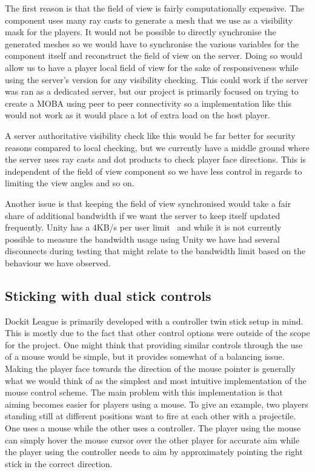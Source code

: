 The first reason is that the field of view is fairly computationally expensive. The component uses many ray casts to generate a mesh that we use as a visibility mask for the players. It would not be possible to directly synchronise the generated meshes so we would have to synchronise the various variables for the component itself and reconstruct the field of view on the server. Doing so would allow us to have a player local field of view for the sake of responsiveness while using the server's version for any visibility checking. This could work if the server was ran as a dedicated server, but our project is primarily focused on trying to create a MOBA using peer to peer connectivity so a implementation like this would not work as it would place a lot of extra load on the host player. 

A server authoritative visibility check like this would be far better for security reasons compared to local checking, but we currently have a middle ground where the server uses ray casts and dot products to check player face directions. This is independent of the field of view component so we have less control in regards to limiting the view angles and so on.

Another issue is that keeping the field of view synchronised would take a fair share of additional bandwidth if we want the server to keep itself updated frequently. Unity has a 4KB/s per user limit~\cite{unityNetworkBandwidthLimit} and while it is not currently possible to measure the bandwidth usage using Unity we have had several disconnects during testing that might relate to the bandwidth limit based on the behaviour we have observed.


\subsection{Sticking with dual stick controls}
Dockit League is primarily developed with a controller twin stick setup in mind. This is mostly due to the fact that other control options were outside of the scope for the project. One might think that providing similar controls through the use of a mouse would be simple, but it provides somewhat of a balancing issue. 
Making the player face towards the direction of the mouse pointer is generally what we would think of as the simplest and most intuitive implementation of the mouse control scheme. The main problem with this implementation is that aiming becomes easier for players using a mouse. To give an example, two players standing still at different positions want to fire at each other with a projectile. One uses a mouse while the other uses a controller. The player using the mouse can simply hover the mouse cursor over the other player for accurate aim while the player using the controller needs to aim by approximately pointing the right stick in the correct direction.  

